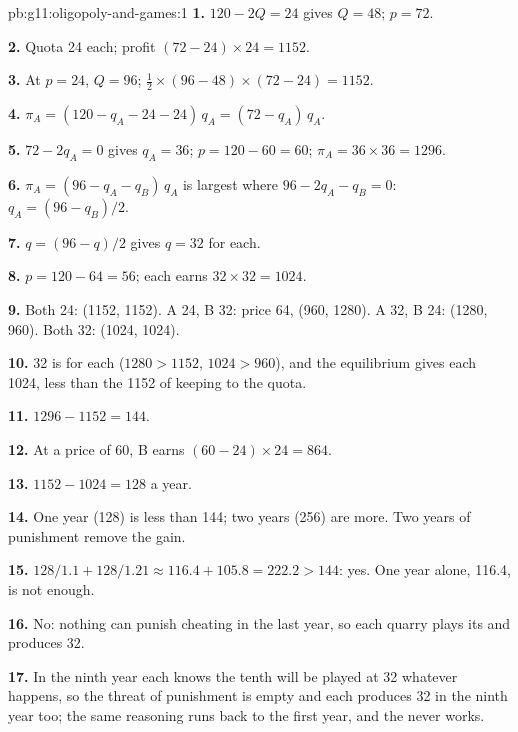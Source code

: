 \begin{solution}{pb:g11:oligopoly-and-games:1}
\textbf{1.} $120 - 2Q = 24$ gives $Q = 48$; $p = 72$.

\textbf{2.} Quota 24 each; profit $(72 - 24) \times 24 = 1152$.

\textbf{3.} At $p = 24$, $Q = 96$;  $\tfrac12 \times (96 - 48) \times (72 - 24) = 1152$.

\textbf{4.} $\pi_A = (120 - q_A - 24 - 24)\,q_A = (72 - q_A)\,q_A$.

\textbf{5.} $72 - 2q_A = 0$ gives $q_A = 36$; $p = 120 - 60 = 60$; $\pi_A = 36 \times 36 = 1296$.

\textbf{6.} $\pi_A = (96 - q_A - q_B)\,q_A$ is largest where $96 - 2q_A - q_B = 0$: $q_A = (96 - q_B)/2$.

\textbf{7.} $q = (96 - q)/2$ gives $q = 32$ for each.

\textbf{8.} $p = 120 - 64 = 56$; each earns $32 \times 32 = 1024$.

\textbf{9.} Both 24: (1152, 1152). A 24, B 32: price 64, (960, 1280). A 32, B 24: (1280, 960). Both 32: (1024, 1024).

\textbf{10.} 32 is  for each ($1280 > 1152$, $1024 > 960$), and the equilibrium gives each 1024, less than the 1152 of keeping to the quota.

\textbf{11.} $1296 - 1152 = 144$.

\textbf{12.} At a price of 60, B earns $(60 - 24) \times 24 = 864$.

\textbf{13.} $1152 - 1024 = 128$ a year.

\textbf{14.} One year (128) is less than 144; two years (256) are more. Two years of punishment remove the gain.

\textbf{15.} $128/1.1 + 128/1.21 \approx 116.4 + 105.8 = 222.2 > 144$: yes. One year alone, 116.4, is not enough.

\textbf{16.} No: nothing can punish cheating in the last year, so each quarry plays its  and produces 32.

\textbf{17.} In the ninth year each knows the tenth will be played at 32 whatever happens, so the threat of punishment is empty and each produces 32 in the ninth year too;
the same reasoning runs back to the first year, and the  never works.


\end{solution}
